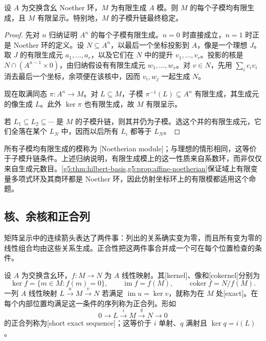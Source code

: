 \begin{proposition}\label{g5:prop:noetherian-finite-modules}
	设 \(A\) 为交换含幺 Noether 环，\(M\) 为有限生成 \(A\) 模。则 \(M\) 的每个子模均有限生成，且 \(M\) 有限呈示。特别地，\(M\) 的子模升链最终稳定。
\end{proposition}
\begin{proof}
	先对 \(n\) 归纳证明 \(A^n\) 的每个子模有限生成。\(n=0\) 时直接成立，\(n=1\) 时正是 Noether 环的定义。设 \(N\subseteq A^n\)，以最后一个坐标投影到 \(A\)，像是一个理想 \(J\)。取 \(J\) 的有限生成元 \(a_1,\ldots,a_r\)，以及它们在 \(N\) 中的提升 \(v_1,\ldots,v_r\)。投影的核是 \(N\cap(A^{n-1}\times0)\)，由归纳假设有有限生成元 \(w_1,\ldots,w_s\)。对 \(v\in N\)，先用 \(\sum_i c_i v_i\) 消去最后一个坐标，余项便在该核中，因而 \(v_i,w_j\) 一起生成 \(N\)。

	现在取满同态 \(\pi:A^n\rightarrow M\)。对 \(L\subseteq M\)，子模 \(\pi^{-1}(L)\subseteq A^n\) 有限生成，其生成元的像生成 \(L\)。此外 \(\ker\pi\) 也有限生成，故 \(M\) 有限呈示。

	若 \(L_1\subseteq L_2\subseteq\cdots\) 是 \(M\) 的子模升链，则其并仍为子模。选这个并的有限生成元，它们全落在某个 \(L_N\) 中，因而以后所有 \(L_i\) 都等于 \(L_N\)。
\end{proof}

所有子模均有限生成的模称为 [Noetherian module]；与理想的情形相同，这等价于子模升链条件。上述归纳说明，有限生成模上的这一性质来自系数环，而非仅仅来自生成元数目。\cref{g5:thm:hilbert-basis,g5:prop:affine-noetherian}保证域上有限变量多项式环及其商环都是 Noether 环，因此仿射坐标环上的有限模都适用这个命题。

\subsection{核、余核和正合列}
\label{g5:subsec:0202:02}

矩阵呈示中的连续箭头表达了两件事：列出的关系确实变为零，而且所有变为零的线性组合均由这些关系生成。正合性把这两件事合并成一个可在每个位置检查的条件。

\begin{definition}\label{g5:def:exact-modules}
	设 \(A\) 为交换含幺环，\(f:M\rightarrow N\) 为 \(A\) 线性映射。其[kernel]、像和[cokernel]分别为
	\[
		\ker f=\{m\in M:f(m)=0\},\qquad
		\operatorname{im}f=f(M),\qquad
		\operatorname{coker}f=N/f(M).
	\]
	一列 \(A\) 线性映射 \(L\xrightarrow{u}M\xrightarrow{v}N\) 若满足 \(\operatorname{im}u=\ker v\)，就称为在 \(M\) 处[exact]。在每个内部位置均满足这一条件的序列称为正合列。形如
	\[
		0\longrightarrow L\xrightarrow{i}M\xrightarrow{q}N\longrightarrow0
	\]
	的正合列称为[short exact sequence]；这等价于 \(i\) 单射、\(q\) 满射且 \(\ker q=i(L)\)。
\end{definition}

